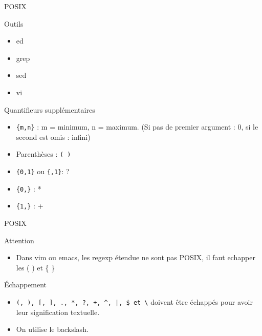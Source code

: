 \def\ftitle{POSIX}
\begin{frame}[containsverbatim]{\ftitle}
\def\blocktitle{Outils}
\begin{block}{\blocktitle}
\begin{itemize}
\item ed
\item grep
\item sed
\item vi
\end{itemize}
\end{block}



\def\blocktitle{Quantifieurs supplémentaires}
\begin{block}{\blocktitle}
\begin{itemize}
\item \verb!{m,n}!	: m = minimum, n = maximum. (Si pas de premier argument : 0, si le second est omis : infini)
\item Parenthèses : \verb!( )!
\item \verb!{0,1}! ou \verb!{,1}!: ?
\item \verb!{0,}! : *
\item \verb!{1,}! : +
\end{itemize}
\end{block}
\end{frame}

\begin{frame}[containsverbatim]{\ftitle}

\def\blocktitle{Attention}
\begin{alertblock}{\blocktitle}
\begin{itemize}
\item Dans vim ou emacs, les regexp étendue ne sont pas POSIX, il faut echapper les ( )  et \{ \}
\end{itemize}
\end{alertblock}

\def\blocktitle{Échappement}
\begin{block}{\blocktitle}
\begin{itemize}
\item \verb!(, ), [, ], ., *, ?, +, ^, |, $ et \! doivent être échappés pour avoir leur signification textuelle. %
\item On utilise le backslash.
\end{itemize}
\end{block}
\end{frame}



